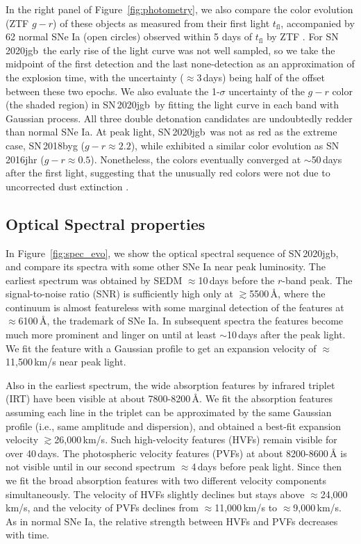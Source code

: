 \documentclass[twocolumn]{aastex631}
\newcommand\sn{SN\,2020jgb}
\begin{document}
In the right panel of Figure~\ref{fig:photometry}, we also compare the color evolution (ZTF $g-r$) of these objects as measured from their first light $t_\mathrm{fl}$, accompanied by 62 normal SNe Ia (open circles) observed within 5 days of $t_\mathrm{fl}$ by ZTF \citep[from][]{Bulla2020}. For \sn\, the early rise of the light curve was not well sampled, so we take the midpoint of the first detection and the last none-detection as an approximation of the explosion time, with the uncertainty ($\approx$3\,days) being half of the offset between these two epochs. We also evaluate the 1-$\sigma$ uncertainty of the $g-r$ color (the shaded region) in \sn\ by fitting the light curve in each band with Gaussian process. All three double detonation candidates are undoubtedly redder than normal SNe Ia. At peak light, \sn\ was not as red as the extreme case, SN\,2018byg ($g-r\approx2.2$), while exhibited a similar color evolution as SN\,2016jhr ($g-r\approx0.5$). Nonetheless, the colors eventually converged at $\sim$50\,days after the first light, suggesting that the unusually red colors were not due to uncorrected dust extinction \citep{de_18byg_2019}.

\subsection{Optical Spectral properties}
In Figure~\ref{fig:spec_evo}, we show the optical spectral sequence of \sn, and compare its spectra with some other SNe Ia near peak luminosity. The earliest spectrum was obtained by SEDM $\approx$10\,days before the $r$-band peak. The signal-to-noise ratio (SNR) is sufficiently high only at $\gtrsim$5500\,\r{A}, where the continuum is almost featureless with some marginal detection of the  features at $\approx$6100\,\r{A}, the trademark of SNe Ia. In subsequent spectra the  features become much more prominent and linger on until at least $\sim$10\,days after the peak light. We fit the  feature with a Gaussian profile to get an expansion velocity of $\approx$11,500\,km/s near peak light. 

Also in the earliest spectrum, the wide absorption features by  infrared triplet (IRT) have been visible at about 7800-8200\,\r{A}. We fit the absorption features assuming each line in the triplet can be approximated by the same Gaussian profile (i.e., same amplitude and dispersion), and obtained a best-fit expansion velocity $\gtrsim$26,000\,km/s. Such high-velocity features (HVFs) remain visible for over 40\,days. The photospheric velocity features (PVFs) at about 8200-8600\,\r{A} is not visible until in our second spectrum $\approx$4\,days before peak light. Since then we fit the broad absorption features with two different velocity components simultaneously. The velocity of HVFs slightly declines but stays above $\approx$24,000\,km/s, and the velocity of PVFs declines from $\approx$11,000\,km/s to $\approx$9,000\,km/s. As in normal SNe Ia, the relative strength between HVFs and PVFs decreases with time.
\end{document}
